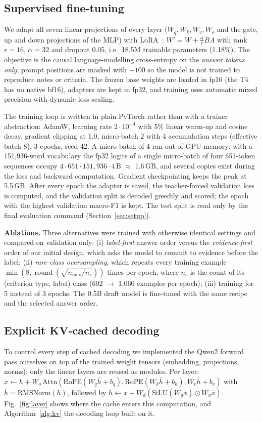 \subsection{Supervised fine-tuning}
\label{sec:finetune}
We adapt all seven linear projections of every layer ($W_q, W_k, W_v, W_o$ and the gate, up and down
projections of the MLP) with LoRA~\cite{hu2022lora}: $W' = W + \frac{\alpha}{r}BA$ with rank $r=16$,
$\alpha=32$ and dropout 0.05, i.e.\ 18.5M trainable parameters (1.18\%). The objective is the causal
language-modelling cross-entropy on the \emph{answer tokens only}; prompt positions are masked with
$-100$ so the model is not trained to reproduce notes or criteria. The frozen base weights are loaded
in fp16 (the T4 has no native bf16), adapters are kept in fp32, and training uses automatic mixed
precision with dynamic loss scaling.

The training loop is written in plain PyTorch rather than with a trainer abstraction: AdamW,
learning rate $2\cdot10^{-4}$ with 5\% linear warm-up and cosine decay, gradient clipping at 1.0,
micro-batch 2 with 4 accumulation steps (effective batch 8), 3 epochs, seed 42. A micro-batch of 4
ran out of GPU memory: with a 151,936-word vocabulary the fp32 logits of a single micro-batch of four
651-token sequences occupy $4\cdot651\cdot151{,}936\cdot4$\,B $\approx$ 1.6\,GB, and several copies
exist during the loss and backward computation. Gradient checkpointing keeps the peak at 5.5\,GB.
After every epoch the adapter is saved, the teacher-forced validation loss is computed, and the
validation split is decoded greedily and scored; the epoch with the highest validation macro-F1 is
kept. The test split is read only by the final evaluation command (Section~\ref{sec:setup}).

\textbf{Ablations.} Three alternatives were trained with otherwise identical settings and compared on
validation only: (i) \emph{label-first} answer order versus the \emph{evidence-first} order of our
initial design, which asks the model to commit to evidence before the label; (ii) \emph{rare-class
oversampling}, which repeats every training example $\min(8,\operatorname{round}(\sqrt{n_{\max}/n_c}))$
times per epoch, where $n_c$ is the count of its (criterion type, label) class (602 $\rightarrow$
1,060 examples per epoch); (iii) training for 5 instead of 3 epochs. The 0.5B draft model is
fine-tuned with the same recipe and the selected answer order.

\subsection{Explicit KV-cached decoding}
\label{sec:kv}
To control every step of cached decoding we implemented the Qwen2 forward pass ourselves on top of
the trained weight tensors (embedding, projections, norms); only the linear layers are reused as
modules. Per layer: $x \leftarrow h + W_o\,\mathrm{Attn}(\mathrm{RoPE}(W_q\bar h + b_q),
\mathrm{RoPE}(W_k\bar h + b_k), W_v\bar h + b_v)$ with $\bar h = \mathrm{RMSNorm}(h)$, followed by
$h \leftarrow x + W_d(\mathrm{SiLU}(W_g\bar x)\odot W_u\bar x)$. Fig.~\ref{fig:layer} shows
where the cache enters this computation, and Algorithm~\ref{alg:kv} the decoding loop built on it.

